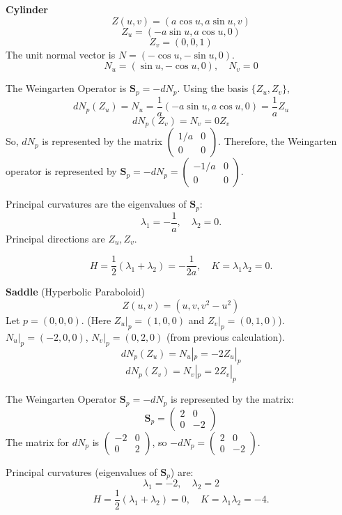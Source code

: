 \documentclass{article}
\begin{document}
\begin{example}
    \textbf{Cylinder}
    $$Z(u, v) = (a \cos u, a \sin u, v)$$
    $$Z_u = (-a \sin u, a \cos u, 0)$$
    $$Z_v = (0, 0, 1)$$
    The unit normal vector is $N = (-\cos u, -\sin u, 0)$.
    $$N_u = (\sin u, -\cos u, 0), \quad N_v = 0$$

    The Weingarten Operator is $\mathbf{S}_p = -d N_p$. Using the basis $\{Z_u, Z_v\}$,
    $$d N_p (Z_u) = N_u = \frac{1}{a} (-a \sin u, a \cos u, 0) = \frac{1}{a} Z_u$$
    $$d N_p (Z_v) = N_v = 0 Z_v$$
    So, $d N_p$ is represented by the matrix $\begin{pmatrix} 1/a & 0 \\ 0 & 0 \end{pmatrix}$.
    Therefore, the Weingarten operator is represented by $\mathbf{S}_p = -d N_p = \begin{pmatrix} -1/a & 0 \\ 0 & 0 \end{pmatrix}$.

    Principal curvatures are the eigenvalues of $\mathbf{S}_p$:
    $$\lambda_1 = -\frac{1}{a}, \quad \lambda_2 = 0.$$
    Principal directions are $Z_u, Z_v$.

    $$H = \frac{1}{2}(\lambda_1 + \lambda_2) = -\frac{1}{2a}, \quad K = \lambda_1 \lambda_2 = 0.$$

    \textbf{Saddle} (Hyperbolic Paraboloid)
    $$Z(u, v) = (u, v, v^2 - u^2)$$
    Let $p = (0, 0, 0)$. (Here $Z_u|_p=(1,0,0)$ and $Z_v|_p=(0,1,0)$).
    $N_u|_p = (-2, 0, 0)$, $N_v|_p = (0, 2, 0)$ (from previous calculation).
    $$d N_p (Z_u) = N_u|_p = -2 Z_u|_p$$
    $$d N_p (Z_v) = N_v|_p = 2 Z_v|_p$$

    The Weingarten Operator $\mathbf{S}_p = -d N_p$ is represented by the matrix:
    $$\mathbf{S}_p = \begin{pmatrix} 2 & 0 \\ 0 & -2 \end{pmatrix}$$
    The matrix for $d N_p$ is $\begin{pmatrix} -2 & 0 \\ 0 & 2 \end{pmatrix}$, so $-d N_p = \begin{pmatrix} 2 & 0 \\ 0 & -2 \end{pmatrix}$.
    
    Principal curvatures (eigenvalues of $\mathbf{S}_p$) are:
    $$\lambda_1 = -2, \quad \lambda_2 = 2$$
    $$H = \frac{1}{2}(\lambda_1 + \lambda_2) = 0, \quad K = \lambda_1 \lambda_2 = -4.$$
\end{example}
\end{document}
